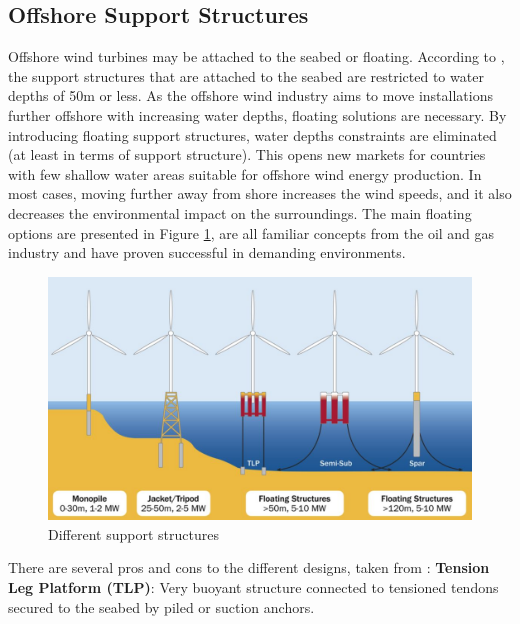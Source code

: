 \subsection{Offshore Support Structures}
Offshore wind turbines may be attached to the seabed or floating. According to \cite{IRENA2016}, the support structures that are attached to the seabed are restricted to water depths of 50m or less. As the offshore wind industry aims to move installations further offshore with increasing water depths, floating solutions are necessary. By introducing floating support structures, water depths constraints are eliminated (at least in terms of support structure). This opens new markets for countries with few shallow water areas suitable for offshore wind energy production. In most cases, moving further away from shore increases the wind speeds, and it also decreases the environmental impact on the surroundings. The main floating options are presented in Figure \ref{fig:supstruc}, are all familiar concepts from the oil and gas industry and have proven successful in demanding environments. 

\begin{figure}[H]
\centering
\includegraphics[scale=0.6]{figures/supstruc}
\caption[$\; \:$Different support structures]{Different support structures \cite{Bailey2014}}
 \label{fig:supstruc}
\end{figure}

\noindent There are several pros and cons to the different designs, taken from \cite{IRENA2016}: \newline
\newline
\textbf{Tension Leg Platform (TLP)}: Very buoyant structure connected to tensioned tendons secured to the seabed by piled or suction anchors.

